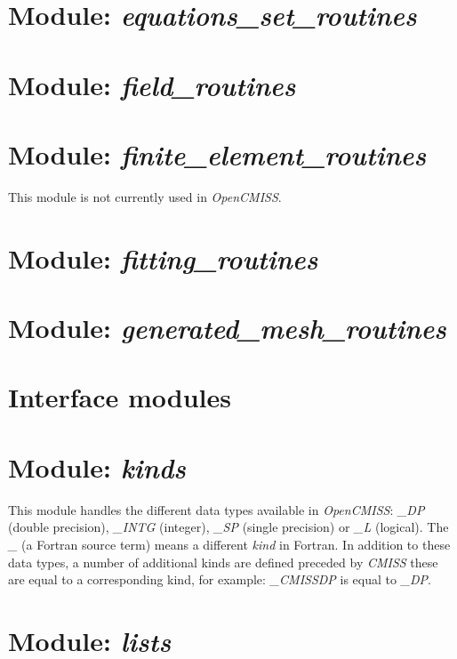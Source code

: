 \section{Module: \emph{equations\_set\_routines}}
\label{sec:equationssetroutines}

\section{Module: \emph{field\_routines}}
\label{sec:fieldroutines}

\section{Module: \emph{finite\_element\_routines}}
\label{sec:finiteelementroutines}

This module is not currently used in \emph{OpenCMISS}.


\section{Module: \emph{fitting\_routines}}
\label{sec:fittingroutines}


\section{Module: \emph{generated\_mesh\_routines}}
\label{sec:generatedmeshroutines}


\section{Interface modules}
\label{sec:interfacemodules}


\section{Module: \emph{kinds}}
\label{sec:kinds}

This module handles the different data types available in \emph{OpenCMISS}: 
\emph{\_DP} (double precision), \emph{\_INTG} (integer), \emph{\_SP} (single 
precision) or \emph{\_L} (logical). The \emph{\_} (a Fortran source term) 
means a different \emph{kind} in Fortran. In addition to these data types, 
a number of additional kinds are defined preceded by \emph{CMISS} these 
are equal to a corresponding kind, for example: \emph{\_CMISSDP} is 
equal to \emph{\_DP}. 


\section{Module: \emph{lists}}
\label{sec:lists}

